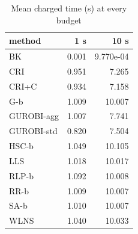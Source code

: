\begin{table}[htbp]
\centering
\small
\caption{Mean charged time (s) at every budget}
\label{tab:E4a_equal_budgets_time_by_budget}
\begin{tabular}{lrr}
\toprule
method & 1 s & 10 s \\
\midrule
BK & 0.001 & 9.770e-04 \\
CRI & 0.951 & 7.265 \\
CRI+C & 0.934 & 7.158 \\
G-b & 1.009 & 10.007 \\
GUROBI-agg & 1.007 & 7.741 \\
GUROBI-std & 0.820 & 7.504 \\
HSC-b & 1.049 & 10.105 \\
LLS & 1.018 & 10.017 \\
RLP-b & 1.092 & 10.008 \\
RR-b & 1.009 & 10.007 \\
SA-b & 1.010 & 10.007 \\
WLNS & 1.040 & 10.033 \\
\bottomrule
\end{tabular}
\end{table}

